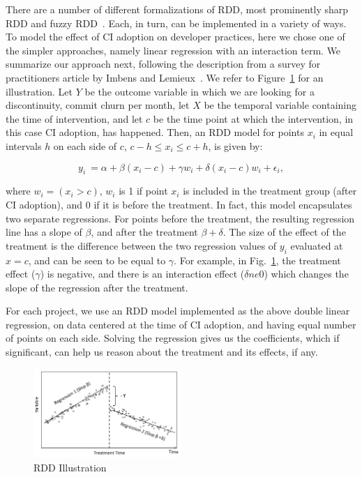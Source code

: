 There are a number of different formalizations of RDD, most prominently 
sharp RDD and fuzzy RDD~\cite{imbens2008regression}.
Each, in turn, can be implemented in a variety of ways.
To model the effect of CI adoption on developer practices, here we chose one 
of the simpler approaches, namely linear regression with an interaction term.
We summarize our approach next, following the description from a survey for practitioners article by Imbens and Lemieux~\cite{imbens2008}.
We refer to Figure~\ref{RDDIllustration} for an illustration.
Let $Y$ be the outcome variable in which we are looking for a discontinuity, 
\eg commit churn per month, let $X$ be the temporal variable containing the 
time of intervention, and let $c$ be the time point at which the intervention, in 
this case CI adoption, has happened.
Then, an RDD model for points $x_i$ in equal intervals $h$ on each side of 
$c$, $c-h \le x_i \le c+h$, is given by:

\[y_i \ = \alpha + \beta(x_i-c) + \gamma w_i + \delta(x_i-c)w_i + \epsilon_i,\]

\noindent where $w_i = (x_i > c)$, \ie $w_i$ is 1 if point $x_i$ is included in 
the treatment group (\eg after CI adoption), and 0 if it is before the treatment.
In fact, this model encapsulates two separate regressions.
For points before the treatment, the resulting regression line has a slope of 
$\beta$, and after the treatment $\beta + \delta$.
The size of the effect of the treatment is the difference between the two 
regression values of $y_i$ evaluated at $x=c$, and can be seen to be equal 
to $\gamma$.
For example, in Fig.~\ref{RDDIllustration}, the treatment effect ($\gamma$) is negative, and there is an interaction effect ($\delta ne 0$) which changes the slope of the regression after the treatment.

For each project, we use an RDD model implemented as the above 
double linear regression, on data centered at the time of CI adoption, and 
having equal number of points on each side.
Solving the regression gives us the coefficients, which if significant, can help us reason about the treatment and its effects, if any.
 

\begin{figure}[t]
	\centering
	\includegraphics[width=0.5\textwidth, clip=true, trim=0 15 15 50]{RDD_ok.png}
	\caption{RDD Illustration}
	\label{RDDIllustration}
\end{figure}

